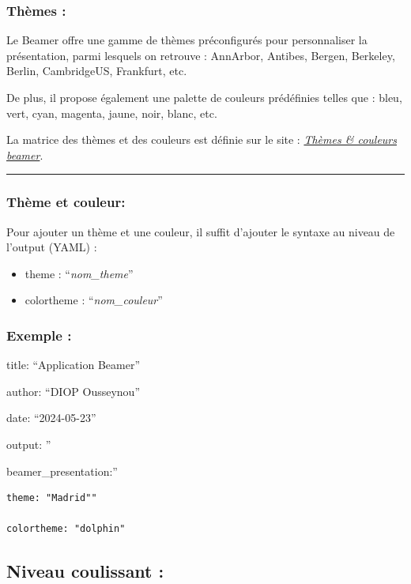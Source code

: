 \documentclass[
  12pt,
]{article}
\begin{document}
\subsubsection{Thèmes :}\label{thuxe8mes}

Le Beamer offre une gamme de thèmes préconfigurés pour personnaliser la
présentation, parmi lesquels on retrouve : AnnArbor, Antibes, Bergen,
Berkeley, Berlin, CambridgeUS, Frankfurt, etc.

De plus, il propose également une palette de couleurs prédéfinies telles
que : bleu, vert, cyan, magenta, jaune, noir, blanc, etc.

La matrice des thèmes et des couleurs est définie sur le site :
\href{https://bookdown.org/yihui/rmarkdown/beamer-presentation.html}{\emph{Thèmes
\& couleurs beamer}}.

\begin{center}\rule{0.5\linewidth}{0.5pt}\end{center}

\subsubsection{Thème et couleur:}\label{thuxe8me-et-couleur}

Pour ajouter un thème et une couleur, il suffit d'ajouter le syntaxe au
niveau de l'output (YAML) :

\begin{itemize}
\item
  theme : ``\emph{nom\_theme}''
\item
  colortheme : ``\emph{nom\_couleur}''
\end{itemize}

\subsubsection{Exemple :}\label{exemple}

title: ``Application Beamer''

author: ``DIOP Ousseynou''

date: ``2024-05-23''

output: ''

beamer\_presentation:''

\begin{verbatim}
theme: "Madrid"" 

colortheme: "dolphin"
\end{verbatim}

\subsection{Niveau coulissant :}\label{niveau-coulissant}
\end{document}
